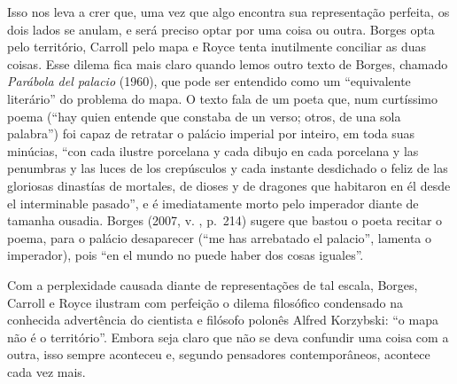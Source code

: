 Isso nos leva a crer que, uma vez que algo encontra sua representação
perfeita, os dois lados se anulam, e será preciso optar por uma coisa ou
outra. Borges opta pelo território, Carroll pelo mapa e Royce tenta
inutilmente conciliar as duas coisas. Esse dilema fica mais claro quando
lemos outro texto de Borges, chamado \emph{Parábola del palacio} (1960),
que pode ser entendido como um ``equivalente literário'' do problema do
mapa. O texto fala de um poeta que, num curtíssimo poema (``hay quien
entende que constaba de un verso; otros, de una sola palabra'') foi
capaz de retratar o palácio imperial por inteiro, em toda suas minúcias,
``con cada ilustre porcelana y cada dibujo en cada porcelana y las
penumbras y las luces de los crepúsculos y cada instante desdichado o
feliz de las gloriosas dinastías de mortales, de dioses y de dragones
que habitaron en él desde el interminable pasado'', e é imediatamente
morto pelo imperador diante de tamanha ousadia. Borges (2007, v. , p.~214) sugere que bastou o poeta recitar o poema, para o palácio
desaparecer (``me has arrebatado el palacio'', lamenta o imperador),
pois ``en el mundo no puede haber dos cosas iguales''.

Com a perplexidade causada diante de representações de tal
escala, Borges, Carroll e Royce ilustram com perfeição o dilema
filosófico condensado na conhecida advertência do cientista e filósofo
polonês Alfred Korzybski: ``o mapa não é o território''. Embora seja
claro que não se deva confundir uma coisa com a outra, isso sempre
aconteceu e, segundo pensadores contemporâneos, acontece cada vez mais.

